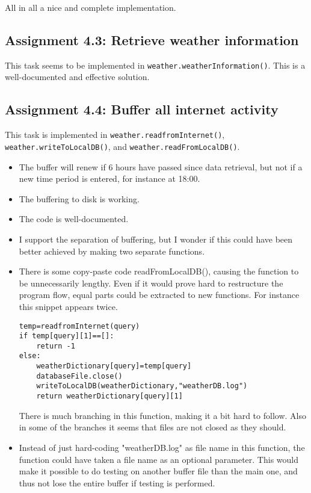 \documentclass[a4paper]{article}
\begin{document}
All in all a nice and complete implementation.


\subsection*{Assignment 4.3: Retrieve weather information}
This task seems to be implemented in \texttt{weather.weatherInformation()}. This is a well-documented and effective solution.

\subsection*{Assignment 4.4: Buffer all internet activity}
This task is implemented in \texttt{weather.readfromInternet()}, \texttt{weather.writeToLocalDB()}, and \texttt{weather.readFromLocalDB()}.

\begin{itemize}
\item The buffer will renew if 6 hours have passed since data retrieval, but not if a new time period is entered, for instance at 18:00.
\item The buffering to disk is working.
  \item The code is well-documented.
  \item I support the separation of buffering, but I wonder if this could have been better achieved by making two separate functions.
  \item There is some copy-paste code readFromLocalDB(), causing the function to be unnecessarily lengthy. Even if it would prove hard to restructure the program flow, equal parts could be extracted to new functions.
For instance this snippet appears twice.

\begin{verbatim}
temp=readfromInternet(query)
if temp[query][1]==[]:
    return -1
else:
    weatherDictionary[query]=temp[query]
    databaseFile.close()
    writeToLocalDB(weatherDictionary,"weatherDB.log")
    return weatherDictionary[query][1] 
\end{verbatim}
There is much branching in this function, making it a bit hard to follow. Also in some of the branches it seems that files are not closed as they should.
  \item Instead of just hard-coding "weatherDB.log" as file name in this function, the function could have taken a file name as an optional parameter. This would make it possible to do testing on another buffer file than the main one, and thus not lose the entire buffer if testing is performed.
\end{itemize}
\end{document}
